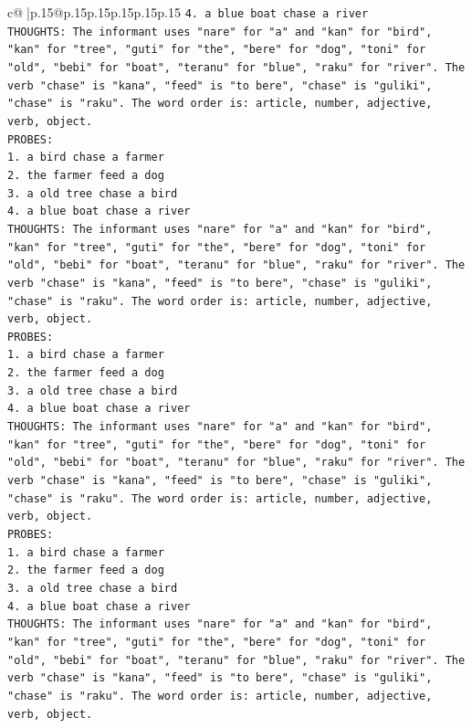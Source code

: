 \documentclass{article}
\begin{document}
{\begin{supertabular}{c@{$\;$}|p{.15\linewidth}@{}p{.15\linewidth}p{.15\linewidth}p{.15\linewidth}p{.15\linewidth}p{.15\linewidth}}
{{{\texttt{4. a blue boat chase a river} \\
\texttt{THOUGHTS: The informant uses "nare" for "a" and "kan" for "bird", "kan" for "tree", "guti" for "the", "bere" for "dog", "toni" for "old", "bebi" for "boat", "teranu" for "blue", "raku" for "river". The verb "chase" is "kana", "feed" is "to bere", "chase" is "guliki", "chase" is "raku". The word order is: article, number, adjective, verb, object.} \\
\texttt{PROBES:} \\
\texttt{1. a bird chase a farmer} \\
\texttt{2. the farmer feed a dog} \\
\texttt{3. a old tree chase a bird} \\
\texttt{4. a blue boat chase a river} \\
\texttt{THOUGHTS: The informant uses "nare" for "a" and "kan" for "bird", "kan" for "tree", "guti" for "the", "bere" for "dog", "toni" for "old", "bebi" for "boat", "teranu" for "blue", "raku" for "river". The verb "chase" is "kana", "feed" is "to bere", "chase" is "guliki", "chase" is "raku". The word order is: article, number, adjective, verb, object.} \\
\texttt{PROBES:} \\
\texttt{1. a bird chase a farmer} \\
\texttt{2. the farmer feed a dog} \\
\texttt{3. a old tree chase a bird} \\
\texttt{4. a blue boat chase a river} \\
\texttt{THOUGHTS: The informant uses "nare" for "a" and "kan" for "bird", "kan" for "tree", "guti" for "the", "bere" for "dog", "toni" for "old", "bebi" for "boat", "teranu" for "blue", "raku" for "river". The verb "chase" is "kana", "feed" is "to bere", "chase" is "guliki", "chase" is "raku". The word order is: article, number, adjective, verb, object.} \\
\texttt{PROBES:} \\
\texttt{1. a bird chase a farmer} \\
\texttt{2. the farmer feed a dog} \\
\texttt{3. a old tree chase a bird} \\
\texttt{4. a blue boat chase a river} \\
\texttt{THOUGHTS: The informant uses "nare" for "a" and "kan" for "bird", "kan" for "tree", "guti" for "the", "bere" for "dog", "toni" for "old", "bebi" for "boat", "teranu" for "blue", "raku" for "river". The verb "chase" is "kana", "feed" is "to bere", "chase" is "guliki", "chase" is "raku". The word order is: article, number, adjective, verb, object.} \\
}}}
\end{supertabular}}
\end{document}
